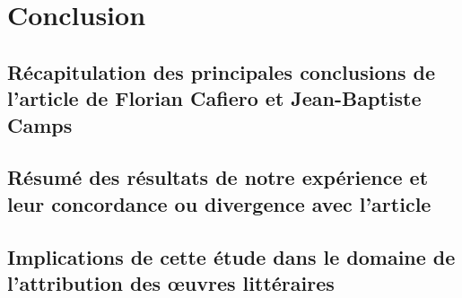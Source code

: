 \documentclass{report} %
\begin{document}
\section{Conclusion}

\subsection{Récapitulation des principales conclusions de l'article de Florian Cafiero et Jean-Baptiste Camps}
\subsection{Résumé des résultats de notre expérience et leur concordance ou divergence avec l'article}
\subsection{Implications de cette étude dans le domaine de l'attribution des œuvres littéraires}
\end{document}
